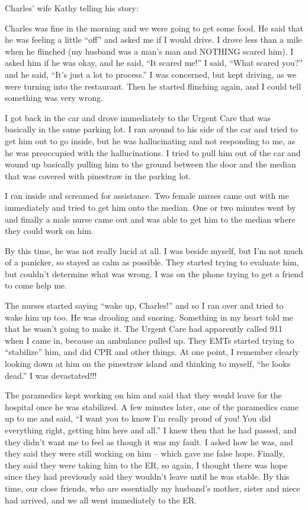 Charles’ wife Kathy telling his story:

Charles was fine in the morning and we were going to get some food. He said that
he was feeling a little “off” and asked me if I would drive. I drove less than a
mile when he flinched (my husband was a man’s man and NOTHING scared him). I
asked him if he was okay, and he said, “It scared me!” I said, “What scared
you?” and he said, “It’s just a lot to process.” I was concerned, but kept
driving, as we were turning into the restaurant. Then he started flinching
again, and I could tell something was very wrong.

I got back in the car and drove immediately to the Urgent Care that was
basically in the same parking lot. I ran around to his side of the car and tried
to get him out to go inside, but he was hallucinating and not responding to me,
as he was preoccupied with the hallucinations. I tried to pull him out of the
car and wound up basically pulling him to the ground between the door and the
median that was covered with pinestraw in the parking lot.

I ran inside and screamed for assistance. Two female nurses came out with me
immediately and tried to get him onto the median. One or two minutes went by and
finally a male nurse came out and was able to get him to the median where they
could work on him.

By this time, he was not really lucid at all. I was beside myself, but I’m not
much of a panicker, so stayed as calm as possible. They started trying to
evaluate him, but couldn’t determine what was wrong. I was on the phone trying
to get a friend to come help me.

The nurses started saying “wake up, Charles!” and so I ran over and tried to
wake him up too. He was drooling and snoring. Something in my heart told me that
he wasn’t going to make it. The Urgent Care had apparently called 911 when I
came in, because an ambulance pulled up. They EMTs started trying to “stabilize”
him, and did CPR and other things. At one point, I remember clearly looking down
at him on the pinestraw island and thinking to myself, “he looks dead.” I was
devastated!!!

The paramedics kept working on him and said that they would leave for the
hospital once he was stabilized. A few minutes later, one of the paramedics came
up to me and said, “I want you to know I’m really proud of you! You did
everything right, getting him here and all.” I knew then that he had passed, and
they didn’t want me to feel as though it was my fault.  I asked how he was, and
they said they were still working on him – which gave me false hope. Finally,
they said they were taking him to the ER, so again, I thought there was hope
since they had previously said they wouldn’t leave until he was stable. By this
time, our close friends, who are essentially my husband’s mother, sister and
niece had arrived, and we all went immediately to the ER.

